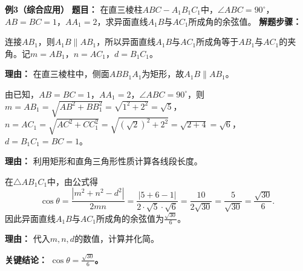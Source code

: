 \begin{examplebox}
	\medskip
	\textbf{\textcolor{CExample}{例3（综合应用）}}
	\textbf{\textcolor{CExample}{题目：}}
	在直三棱柱$ABC-A_1B_1C_1$中，$\angle ABC=90^\circ$，$AB=BC=1$，$AA_1=2$，求异面直线$A_1B$与$AC_1$所成角的余弦值。
	\textbf{\textcolor{CExample}{解题步骤：}}
	\begin{description}[style=nextline, leftmargin=2.8em, labelsep=0.5em, itemsep=0.45em]
		\item[\textbf{第一步（平移转化）：}]
			连接$AB_1$，则$A_1B\parallel AB_1$，所以异面直线$A_1B$与$AC_1$所成角等于$AB_1$与$AC_1$的夹角。记$m=AB_1$，$n=AC_1$，$d=B_1C_1$。
			\par\textbf{理由：} 在直三棱柱中，侧面$ABB_1A_1$为矩形，故$A_1B\parallel AB_1$。
		\item[\textbf{第二步（长度计算）：}]
			由已知，$AB=BC=1$，$AA_1=2$，$\angle ABC=90^\circ$，则 $m=AB_1=\sqrt{AB^2+BB_1^2}=\sqrt{1^2+2^2}=\sqrt{5}$， $n=AC_1=\sqrt{AC^2+CC_1^2}=\sqrt{(\sqrt{2})^2+2^2}=\sqrt{2+4}=\sqrt{6}$， $d=B_1C_1=BC=1$。
			\par\textbf{理由：} 利用矩形和直角三角形性质计算各线段长度。
		\item[\textbf{第三步（套用公式）：}]
			在$\triangle AB_1C_1$中，由公式得
			\[
				\cos\theta=\frac{|m^2+n^2-d^2|}{2mn}=\frac{|5+6-1|}{2\cdot\sqrt{5}\cdot\sqrt{6}}=\frac{10}{2\sqrt{30}}=\frac{5}{\sqrt{30}}=\frac{\sqrt{30}}{6}.
			\]
			因此异面直线$A_1B$与$AC_1$所成角的余弦值为$\frac{\sqrt{30}}{6}$。
			\par\textbf{理由：} 代入$m,n,d$的数值，计算并化简。
	\end{description}
	\textbf{\textcolor{CExample}{关键结论：}}
	\textbf{$\cos\theta=\frac{\sqrt{30}}{6}$。}
\end{examplebox}
